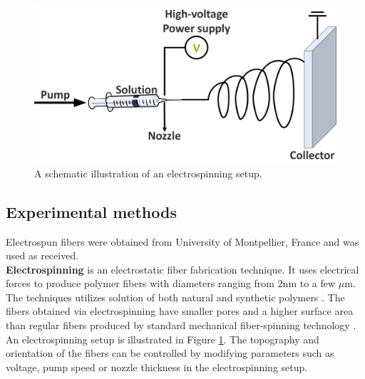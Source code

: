 \begin{figure}[th!]
\centering
\includegraphics[width=\textwidth]{Figures/chap6fig/electrospinning}
\caption{A schematic illustration of an electrospinning setup.}
\label{Figures/chap6fig:electrospinning}
\end{figure}

\subsection{Experimental methods}
Electrospun  fibers were obtained from University of Montpellier, France and was used as received. \\
\textbf{Electrospinning} is an electrostatic fiber fabrication technique. It uses electrical forces to produce polymer fibers with diameters ranging from 2nm to a few $\mu$m. The techniques utilizes solution of both natural and synthetic polymers \cite{bhardwaj_electrospinning_2010}. The fibers obtained via electrospinning have smaller pores and a higher surface area than regular fibers produced by standard mechanical fiber-spinning technology \cite{huang_review_2003}. An electrospinning setup is illustrated in Figure \ref{Figures/chap6fig:electrospinning}. The topography and orientation of the fibers can be controlled by modifying parameters such as voltage, pump speed or nozzle thickness in the electrospinning setup.



